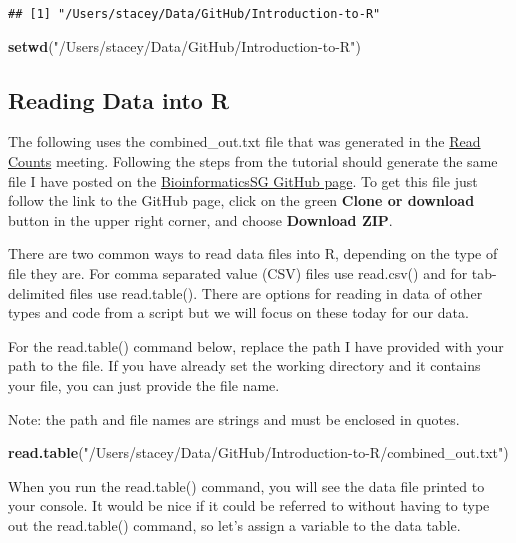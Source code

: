 \documentclass[]{article}
\newenvironment{Shaded}{\begin{snugshade}}{\end{snugshade}}
\newcommand{\KeywordTok}[1]{\textcolor[rgb]{0.13,0.29,0.53}{\textbf{#1}}}
\newcommand{\StringTok}[1]{\textcolor[rgb]{0.31,0.60,0.02}{#1}}
\newcommand{\NormalTok}[1]{#1}
\begin{document}
\begin{verbatim}
## [1] "/Users/stacey/Data/GitHub/Introduction-to-R"
\end{verbatim}

\begin{Shaded}
\begin{Highlighting}[]
\KeywordTok{setwd}\NormalTok{(}\StringTok{"/Users/stacey/Data/GitHub/Introduction-to-R"}\NormalTok{)}
\end{Highlighting}
\end{Shaded}

\subsection{Reading Data into R}\label{reading-data-into-r}

The following uses the combined\_out.txt file that was generated in the
\href{https://sites.google.com/view/bioinformaticssg/presentations/read-counts}{Read
Counts} meeting. Following the steps from the tutorial should generate
the same file I have posted on the
\href{https://github.com/bioinformaticssg/Introduction-to-R}{BioinformaticsSG
GitHub page}. To get this file just follow the link to the GitHub page,
click on the green \textbf{Clone or download} button in the upper right
corner, and choose \textbf{Download ZIP}.

There are two common ways to read data files into R, depending on the
type of file they are. For comma separated value (CSV) files use
read.csv() and for tab-delimited files use read.table(). There are
options for reading in data of other types and code from a script but we
will focus on these today for our data.

For the read.table() command below, replace the path I have provided
with your path to the file. If you have already set the working
directory and it contains your file, you can just provide the file name.

Note: the path and file names are strings and must be enclosed in
quotes.

\begin{Shaded}
\begin{Highlighting}[]
\KeywordTok{read.table}\NormalTok{(}\StringTok{"/Users/stacey/Data/GitHub/Introduction-to-R/combined_out.txt"}\NormalTok{)}
\end{Highlighting}
\end{Shaded}

When you run the read.table() command, you will see the data file
printed to your console. It would be nice if it could be referred to
without having to type out the read.table() command, so let's assign a
variable to the data table.
\end{document}
